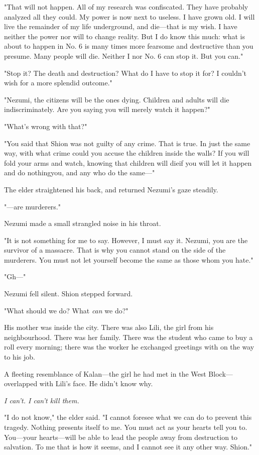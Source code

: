 "That will not happen. All of my research was confiscated. They have
probably analyzed all they could. My power is now next to useless. I
have grown old. I will live the remainder of my life underground, and
die---that is my wish. I have neither the power nor will to change
reality. But I do know this much: what is about to happen in No. 6 is
many times more fearsome and destructive than you presume. Many people
will die. Neither I nor No. 6 can stop it. But you can."

"Stop it? The death and destruction? What do I have to stop it for? I
couldn't wish for a more splendid outcome."

"Nezumi, the citizens will be the ones dying. Children and adults will
die indiscriminately. Are you saying you will merely watch it happen?"

"What's wrong with that?"

"You said that Shion was not guilty of any crime. That is true. In just
the same way, with what crime could you accuse the children inside the
walls? If you will fold your arms and watch, knowing that children will
die\el if you will let it happen and do nothing\el you, and any who do
the same---"

The elder straightened his back, and returned Nezumi's gaze steadily.

"---are murderers."

Nezumi made a small strangled noise in his throat.

"It is not something for me to say. However, I must say it. Nezumi, you
are the survivor of a massacre. That is why you cannot stand on the side
of the murderers. You must not let yourself become the same as those
whom you hate."

"Gh---"

Nezumi fell silent. Shion stepped forward.

"What should we do? What \emph{can} we do?"

His mother was inside the city. There was also Lili, the girl from his
neighbourhood. There was her family. There was the student who came to
buy a roll every morning; there was the worker he exchanged greetings
with on the way to his job.

A fleeting resemblance of Kalan---the girl he had met in the West
Block---overlapped with Lili's face. He didn't know why.

\emph{I can't. I can't kill them.}

"I do not know," the elder said. "I cannot foresee what we can do to
prevent this tragedy. Nothing presents itself to me. You must act as
your hearts tell you to. You---your hearts---will be able to lead the people
away from destruction to salvation. To me that is how it seems, and I
cannot see it any other way. Shion."

